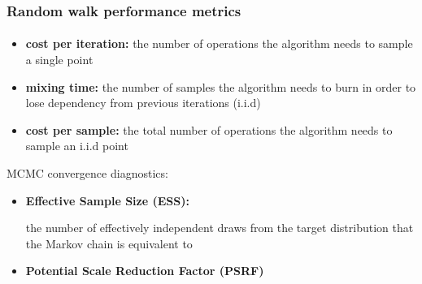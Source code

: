 \documentclass{beamer}
\begin{document}
   \begin{frame}
      \frametitle{Random walk performance metrics}
      \framesubtitle{}
      
      \begin{itemize}
         \item \textbf{cost per iteration:} the number of operations the algorithm needs to sample a single point
         \item \textbf{mixing time:} the number of samples the algorithm needs to burn in order to lose dependency from previous iterations (i.i.d)
         \item \textbf{cost per sample:} the total number of operations the algorithm needs to sample an i.i.d point

      \end{itemize}

      MCMC convergence diagnostics:

      \begin{itemize}
         \item \textbf{Effective Sample Size (ESS): } 


         the number of effectively independent draws from
         the target distribution that the Markov chain is equivalent to

         \item \textbf{Potential Scale Reduction Factor (PSRF)}
         
      \end{itemize}
   
   \end{frame}
\end{document}
